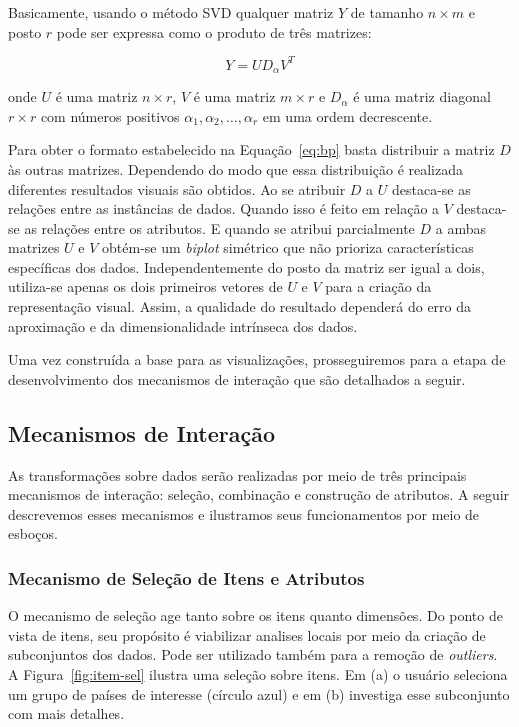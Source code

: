 Basicamente, usando o método SVD qualquer matriz $Y$
de tamanho $n \times m$ e posto $r$ pode ser expressa como o
produto de três matrizes:

\begin{equation}
    Y = UD_{\alpha}V^T
\end{equation}

\noindent onde $U$ é uma matriz $n \times r$, $V$ é uma matriz $m
\times r$ e $D_\alpha$ é uma matriz diagonal $r \times r$
com números positivos $\alpha_1,\alpha_2,\ldots,\alpha_r$ em
uma ordem decrescente. 

Para obter o formato estabelecido na Equação~\ref{eq:bp}
basta distribuir a matriz $D$ às outras matrizes. Dependendo
do modo que essa distribuição é realizada diferentes
resultados visuais são obtidos. Ao se atribuir $D$ a $U$
destaca-se as relações entre as instâncias de dados. Quando
isso é feito em relação a $V$ destaca-se as relações entre
os atributos. E quando se atribui parcialmente $D$ a ambas
matrizes $U$ e $V$ obtém-se um \emph{biplot} simétrico que não
prioriza características específicas dos dados.
Independentemente do posto da matriz ser igual a dois,
utiliza-se apenas os dois primeiros vetores de $U$ e $V$
para a criação da representação visual. Assim, a qualidade
do resultado dependerá do erro da aproximação e da
dimensionalidade intrínseca dos dados. 

Uma vez construída a base para as visualizações, 
prosseguiremos para a etapa de desenvolvimento dos
mecanismos de interação que são detalhados a seguir.

\subsection{Mecanismos de Interação}

As transformações sobre dados serão realizadas
por meio de três principais mecanismos de interação:
seleção, combinação e construção de atributos. A seguir
descrevemos esses mecanismos e ilustramos seus
funcionamentos por meio de esboços.

\subsubsection{Mecanismo de Seleção de Itens e Atributos}

O mecanismo de seleção age tanto sobre os itens quanto
dimensões. Do ponto de vista de itens, seu propósito é
viabilizar analises locais por meio da criação de
subconjuntos dos dados. Pode ser utilizado também para a
remoção de \emph{outliers}. A Figura~\ref{fig:item-sel}
ilustra uma seleção sobre itens. Em (a) o usuário seleciona
um grupo de países de interesse (círculo azul) e em (b)
investiga esse subconjunto com mais detalhes. 

